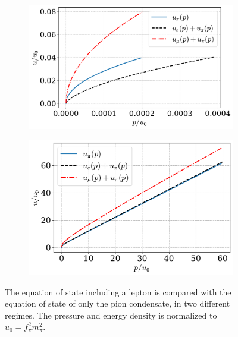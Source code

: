 \begin{figure}
    \centering
    \begin{subfigure}{0.49\textwidth}
        \includegraphics[width=\textwidth]{../scripts/figurer/charge_neutrality/eos_nr.pdf}
    \end{subfigure}
    \begin{subfigure}{0.49\textwidth}
        \includegraphics[width=\textwidth]{../scripts/figurer/charge_neutrality/eos_ur.pdf}
    \end{subfigure}
    \caption{
        The equation of state including a lepton is compared with the equation of state of only the pion condensate, in two different regimes.
        The pressure and energy density is normalized to $u_0 = f_\pi^2 m_\pi^2$.
    }
    \label{fig: eos with leptons}
\end{figure}



